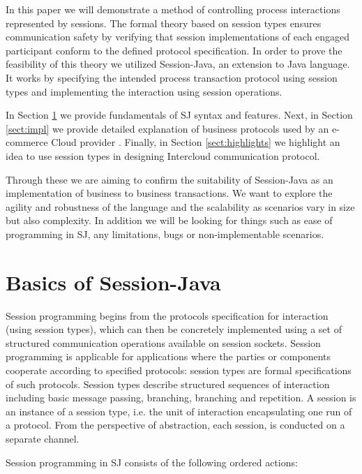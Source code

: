 \documentclass[a4paper]{easychair}
\begin{document}
In this paper we will demonstrate a method of controlling process interactions represented by sessions. The formal theory based on session types ensures communication safety by verifying that session implementations of each engaged participant conform to the defined protocol specification. In order to prove the feasibility of this theory we utilized Session-Java, an extension to Java language. It works by specifying the intended process transaction protocol using session types and implementing the interaction using session operations.

In Section \ref{sect:basics} we provide fundamentals of SJ syntax and features. Next, in Section \ref{sect:impl} we provide detailed explanation of business protocols used by an e-commerce Cloud provider \cite{v3na-cloud}. Finally, in Section \ref{sect:highlights} we highlight an idea to use session types in designing Intercloud \cite{intercloud} communication protocol.

Through these we are aiming to confirm the suitability of Session-Java as an implementation of business to business transactions. We want to explore the agility and robustness of the language and the scalability as scenarios vary in size but also complexity. In addition we will be looking for things such as ease of programming in SJ, any limitations, bugs or non-implementable scenarios.

\section{Basics of Session-Java}
\label{sect:basics}

Session programming begins from the protocols specification for interaction (using session types), which can then be concretely implemented using a set of structured communication operations available on session sockets. Session programming is applicable for applications where the parties or components cooperate according to specified protocols: session types are formal specifications of such protocols. Session types describe structured sequences of interaction including basic message passing, branching, branching and repetition. A session is an instance of a session type, i.e. the unit of interaction encapsulating one run of a protocol. From the perspective of abstraction, each session, is conducted on a separate channel. 

Session programming in SJ consists of the following ordered actions:
\end{document}
